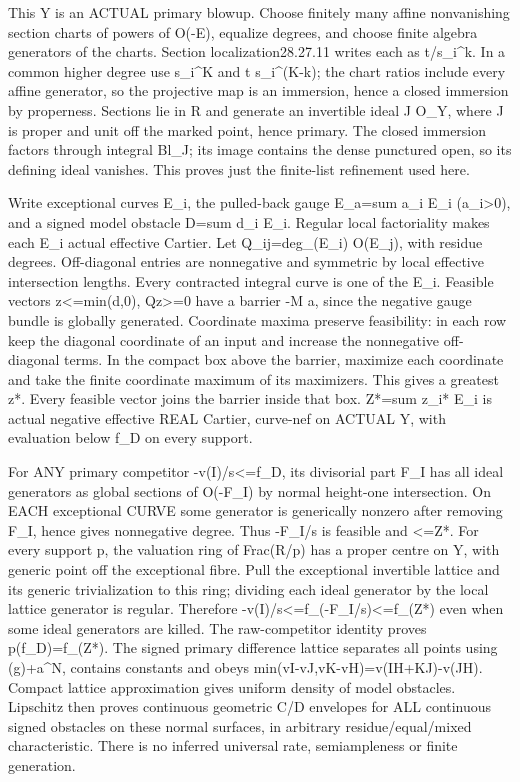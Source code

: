 \documentclass[11pt]{article}
\begin{document}
This Y is an ACTUAL primary blowup. Choose finitely many affine nonvanishing section charts of powers of O(-E), equalize degrees, and choose finite algebra generators of the charts. Section localization28.27.11 writes each as t/s\_i\textasciicircum{}k. In a common higher degree use s\_i\textasciicircum{}K and t s\_i\textasciicircum{}(K-k); the chart ratios include every affine generator, so the projective map is an immersion, hence a closed immersion by properness. Sections lie in R and generate an invertible ideal J O\_Y, where J is proper and unit off the marked point, hence primary. The closed immersion factors through integral Bl\_J; its image contains the dense punctured open, so its defining ideal vanishes. This proves just the finite-list refinement used here.

Write exceptional curves E\_i, the pulled-back gauge E\_a=sum a\_i E\_i (a\_i\textgreater{}0), and a signed model obstacle D=sum d\_i E\_i. Regular local factoriality makes each E\_i actual effective Cartier. Let Q\_ij=deg\_(E\_i) O(E\_j), with residue degrees. Off-diagonal entries are nonnegative and symmetric by local effective intersection lengths. Every contracted integral curve is one of the E\_i. Feasible vectors z\textless{}=min(d,0), Qz\textgreater{}=0 have a barrier -M a, since the negative gauge bundle is globally generated. Coordinate maxima preserve feasibility: in each row keep the diagonal coordinate of an input and increase the nonnegative off-diagonal terms. In the compact box above the barrier, maximize each coordinate and take the finite coordinate maximum of its maximizers. This gives a greatest z*. Every feasible vector joins the barrier inside that box. Z*=sum z\_i* E\_i is actual negative effective REAL Cartier, curve-nef on ACTUAL Y, with evaluation below f\_D on every support.

For ANY primary competitor -v(I)/s\textless{}=f\_D, its divisorial part F\_I has all ideal generators as global sections of O(-F\_I) by normal height-one intersection. On EACH exceptional CURVE some generator is generically nonzero after removing F\_I, hence gives nonnegative degree. Thus -F\_I/s is feasible and \textless{}=Z*. For every support p, the valuation ring of Frac(R/p) has a proper centre on Y, with generic point off the exceptional fibre. Pull the exceptional invertible lattice and its generic trivialization to this ring; dividing each ideal generator by the local lattice generator is regular. Therefore -v(I)/s\textless{}=f\_(-F\_I/s)\textless{}=f\_(Z*) even when some ideal generators are killed. The raw-competitor identity proves p(f\_D)=f\_(Z*). The signed primary difference lattice separates all points using (g)+a\textasciicircum{}N, contains constants and obeys min(vI-vJ,vK-vH)=v(IH+KJ)-v(JH). Compact lattice approximation gives uniform density of model obstacles. Lipschitz then proves continuous geometric C/D envelopes for ALL continuous signed obstacles on these normal surfaces, in arbitrary residue/equal/mixed characteristic. There is no inferred universal rate, semiampleness or finite generation.
\end{document}
